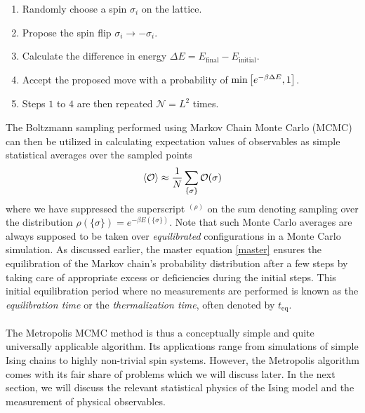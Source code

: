\documentclass[../thesis_main.tex]{subfiles}
\begin{document}
\begin{enumerate}
    \setlength\itemsep{0.3em}
    \item Randomly choose a spin $\sigma_i$ on the lattice.
    \item Propose the spin flip $\sigma_i \to - \sigma_i$.
    \item Calculate the difference in energy $\Delta E = E_\text{final} - E_\text{initial}$.
    \item Accept the proposed move with a probability of $\min \qty[e^{-\beta \Delta E}, 1]$.
    \item Steps $1$ to $4$ are then repeated $\mathcal{N} = L^2$ times.       
\end{enumerate}
The Boltzmann sampling performed using Markov Chain Monte Carlo (MCMC) can then be utilized in calculating expectation values of observables as simple statistical averages over the sampled points
\begin{equation}
    \expval{\mathcal{O}} \approx \frac{1}{N} \sum_{\{\sigma\}} \mathcal{O(\sigma)}
\end{equation}
where we have suppressed the superscript ${}^{(\rho)}$ on the sum denoting sampling over the distribution $\rho(\{\sigma\}) = e^{-\beta E(\{\sigma\})}$. Note that such Monte Carlo averages are always supposed to be taken over \textit{equilibrated} configurations in a Monte Carlo simulation. As discussed earlier, the master equation \eqref{master} ensures the equilibration of the Markov chain's probability distribution after a few steps by taking care of appropriate excess or deficiencies during the initial steps. This initial equilibration period where no measurements are performed is known as the \textit{equilibration time} or the \textit{thermalization time}, often denoted by $t_\text{eq}$.~\\~\\
The Metropolis MCMC method is thus a conceptually simple and quite universally applicable algorithm. Its applications range from simulations of simple Ising chains to highly non-trivial spin systems. However, the Metropolis algorithm comes with its fair share of problems which we will discuss later. In the next section, we will discuss the relevant statistical physics of the Ising model and the measurement of physical observables.
\end{document}
